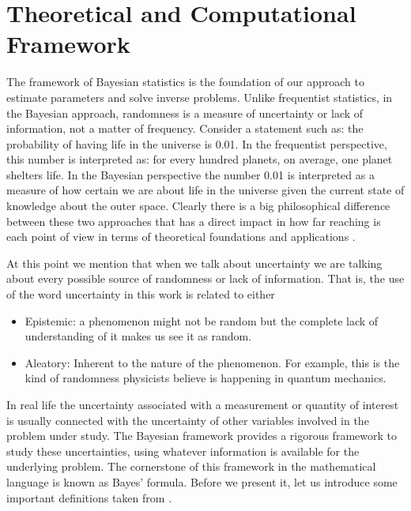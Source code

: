 \documentclass[12pt]{book}
\begin{document}
\chapter{Theoretical and Computational Framework}


The framework of Bayesian statistics is the foundation of  our approach to estimate parameters and solve 
inverse problems. Unlike frequentist statistics, in the Bayesian approach, randomness
is a measure of uncertainty or lack of information,  not a matter of frequency. Consider a statement such  as:
the probability of having life in the universe is 0.01. In the frequentist
perspective, this number is interpreted as: for every hundred planets, on average, one planet shelters life.
 In the Bayesian
perspective the number 0.01 is interpreted as a measure of how certain we are about life in the universe
given the current state of knowledge about the outer space. 
Clearly there is a big philosophical
difference between these two approaches that has a direct impact in how far reaching is each point of view 
in terms of theoretical foundations and applications  \cite{jaynes2003probability}.


At this point we mention that when we talk about uncertainty we are talking about every possible 
source of randomness  or  lack of information. That is, the use of the word uncertainty in this work
is related to either \cite{kennedy2001bayesian}
\begin{itemize}
\item Epistemic: a phenomenon might not be random but the complete lack of 
understanding of it makes us see it as random.
\item Aleatory: Inherent to the nature of the phenomenon. For 
example, this is the kind of randomness physicists believe is happening in quantum mechanics.
\end{itemize}
In real life the uncertainty associated with a  measurement or  quantity 
of interest is usually connected  with the uncertainty  of other variables involved in the problem under study. 
The Bayesian framework provides a rigorous framework to study these uncertainties, 
using whatever information is available for the underlying problem. The cornerstone of this framework
in the mathematical language is known as   Bayes' formula. Before we present it, let us 
introduce some important definitions taken from \cite{dudley2002real}.
\end{document}
